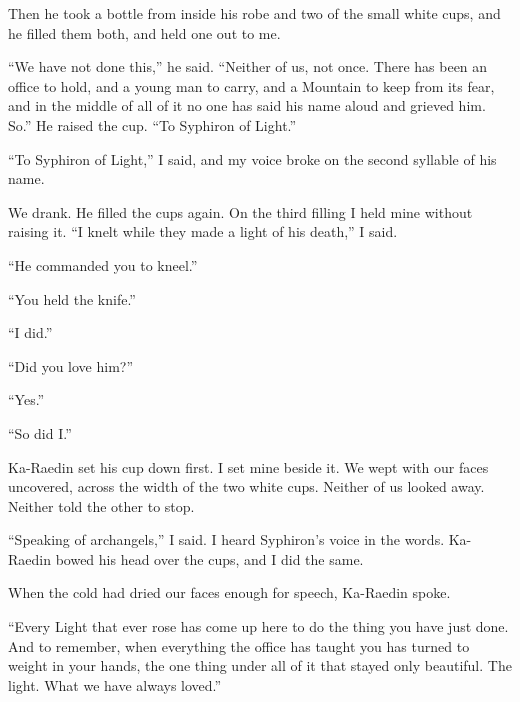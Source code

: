Then he took a bottle from inside his robe and two of the small white cups, and he filled them both, and held one out to me.\par

``We have not done this,'' he said. ``Neither of us, not once. There has been an office to hold, and a young man to carry, and a Mountain to keep from its fear, and in the middle of all of it no one has said his name aloud and grieved him. So.'' He raised the cup. ``To Syphiron of Light.''\par

``To Syphiron of Light,'' I said, and my voice broke on the second syllable of his name.\par

We drank. He filled the cups again. On the third filling I held mine without raising it. ``I knelt while they made a light of his death,'' I said.\par

``He commanded you to kneel.''\par

``You held the knife.''\par

``I did.''\par

``Did you love him?''\par

``Yes.''\par

``So did I.''\par

Ka-Raedin set his cup down first. I set mine beside it. We wept with our faces uncovered, across the width of the two white cups. Neither of us looked away. Neither told the other to stop.\par

``Speaking of archangels,'' I said. I heard Syphiron's voice in the words. Ka-Raedin bowed his head over the cups, and I did the same.\par

When the cold had dried our faces enough for speech, Ka-Raedin spoke.\par

``Every Light that ever rose has come up here to do the thing you have just done. And to remember, when everything the office has taught you has turned to weight in your hands, the one thing under all of it that stayed only beautiful. The light. What we have always loved.''\par

